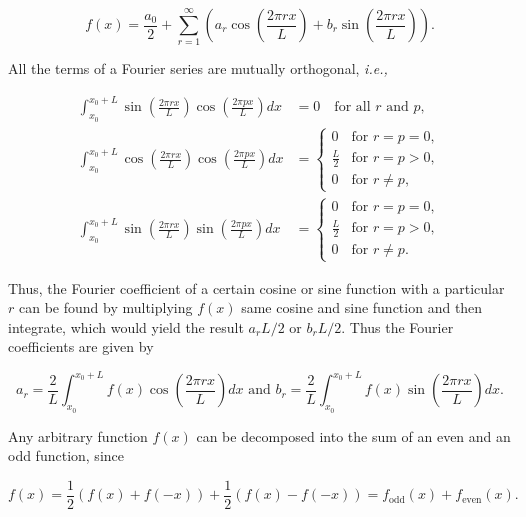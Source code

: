 \documentclass[english,a4paper,12pt]{report}
\begin{document}
\begin{equation}
    f(x) = \frac{a_0 }{2} + \sum_{r=1}^{\infty} \left( a_{r} \cos \left( \frac{2\pi rx}{L}  \right) + b_{r} \sin \left( \frac{2\pi rx}{L}  \right)  \right). 
\end{equation}

All the terms of a Fourier series are mutually orthogonal, \textit{i.e.,} 

\begin{equation}
    \begin{aligned}
        \int_{x_0}^{x_0+L} \sin\left(\frac{2\pi r x}{L}\right) \cos\left(\frac{2\pi p x}{L}\right) dx &= 0 \quad \text{for all } r \text{ and } p, \\
        \int_{x_0}^{x_0+L} \cos\left(\frac{2\pi r x}{L}\right) \cos\left(\frac{2\pi p x}{L}\right) dx &=
\begin{cases} 
    0 & \text{for } r = p = 0, \\
    \frac{L}{2} & \text{for } r = p > 0, \\
    0 & \text{for } r \neq p,
\end{cases} \\
\int_{x_0}^{x_0+L} \sin\left(\frac{2\pi r x}{L}\right) \sin\left(\frac{2\pi p x}{L}\right) dx &=
\begin{cases} 
    0 & \text{for } r = p = 0, \\
    \frac{L}{2} & \text{for } r = p > 0, \\
    0 & \text{for } r \neq p.
\end{cases}
    \end{aligned}
\end{equation}

Thus, the Fourier coefficient of a certain cosine or sine function with a particular \(r\) can be found by multiplying \(f(x)\) same cosine and sine function and then integrate, which would yield the result \(a_{r}L/2  \text { or } b_{r}L/2  \). Thus the Fourier coefficients are given by 

\begin{equation}
    a_{r} = \frac{2}{L} \int_{x_0}^{x_0 + L} f(x) \cos \left( \frac{2\pi rx}{L}  \right) dx \text { and } b_{r} = \frac{2}{L} \int_{x_0 }^{x_0 + L} f(x) \sin \left( \frac{2\pi rx}{L}  \right) dx.   
\end{equation}

Any arbitrary function \(f(x)\) can be decomposed into the sum of an even and an odd function, since

\begin{equation}
    f(x) = \frac{1}{2}(f(x) + f(-x)) + \frac{1}{2} (f(x) - f(-x)) = f_{\text{odd} }(x) + f_{\text{even} }(x).
\end{equation}
\end{document}

